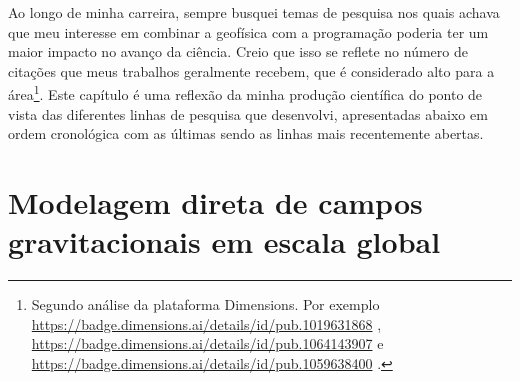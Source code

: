 \documentclass[10pt,a4paper,oneside]{book}
\begin{document}
Ao longo de minha carreira, sempre busquei temas de pesquisa nos quais achava
que meu interesse em combinar a geofísica com a programação poderia ter um
maior impacto no avanço da ciência.
Creio que isso se reflete no número de citações que meus trabalhos geralmente
recebem, que é considerado alto para a área\footnote{Segundo análise da
  plataforma Dimensions. Por exemplo
  \url{https://badge.dimensions.ai/details/id/pub.1019631868} \citep{Uieda2012},
  \url{https://badge.dimensions.ai/details/id/pub.1064143907} \citep{Uieda2016} e
  \url{https://badge.dimensions.ai/details/id/pub.1059638400} \citep{Uieda2017}.
}.
Este capítulo é uma reflexão da minha produção científica do ponto de vista das
diferentes linhas de pesquisa que desenvolvi, apresentadas abaixo em ordem
cronológica com as últimas sendo as linhas mais recentemente abertas.

\section{Modelagem direta de campos gravitacionais em escala global}
\label{sec_modelagemdireta}
\end{document}
